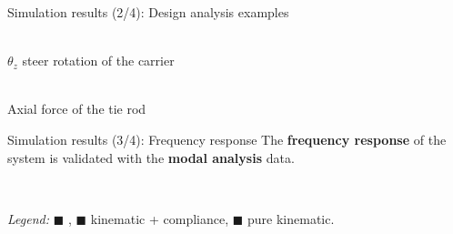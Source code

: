\begin{frame}{Simulation results (2/4): Design analysis examples}
   \\[1.5em]
  \begin{center}
    \begin{minipage}[c]{0.475\linewidth}
       \\
      $\theta_z$ steer rotation of the carrier
      \\[0.5em]
    \end{minipage}
    \begin{minipage}[c]{0.475\linewidth}
       \\
      Axial force of the tie rod \\[0.5em]
    \end{minipage}
  \end{center}
\end{frame}

\begin{frame}{Simulation results (3/4): Frequency response}
  The \textbf{frequency response} of the system is validated with the \Ansys{} \textbf{modal analysis} data. \\[1.0em]
  \begin{minipage}[c]{0.69\linewidth}
     \\[0.25em]
  \end{minipage}
  \hfill
  \begin{minipage}[c]{0.3\linewidth}
  \end{minipage}
  \begin{center}
    \emph{Legend:}
    {\color{mycolor1}$\blacksquare$} \Ansys{}, {\color{mycolor2}$\blacksquare$} kinematic + compliance, {\color{mycolor3}$\blacksquare$} pure kinematic.
  \end{center}
\end{frame}

